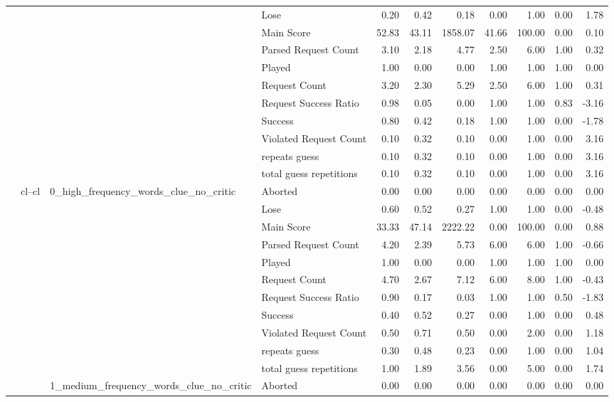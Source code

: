 \begin{tabular}{llllrrrrrrr}
 &  &  & Lose & 0.20 & 0.42 & 0.18 & 0.00 & 1.00 & 0.00 & 1.78 \\
 &  &  & Main Score & 52.83 & 43.11 & 1858.07 & 41.66 & 100.00 & 0.00 & 0.10 \\
 &  &  & Parsed Request Count & 3.10 & 2.18 & 4.77 & 2.50 & 6.00 & 1.00 & 0.32 \\
 &  &  & Played & 1.00 & 0.00 & 0.00 & 1.00 & 1.00 & 1.00 & 0.00 \\
 &  &  & Request Count & 3.20 & 2.30 & 5.29 & 2.50 & 6.00 & 1.00 & 0.31 \\
 &  &  & Request Success Ratio & 0.98 & 0.05 & 0.00 & 1.00 & 1.00 & 0.83 & -3.16 \\
 &  &  & Success & 0.80 & 0.42 & 0.18 & 1.00 & 1.00 & 0.00 & -1.78 \\
 &  &  & Violated Request Count & 0.10 & 0.32 & 0.10 & 0.00 & 1.00 & 0.00 & 3.16 \\
 &  &  & repeats guess & 0.10 & 0.32 & 0.10 & 0.00 & 1.00 & 0.00 & 3.16 \\
 &  &  & total guess repetitions & 0.10 & 0.32 & 0.10 & 0.00 & 1.00 & 0.00 & 3.16 \\
\cline{2-11} \cline{3-11}
 & \multirow[t]{33}{*}{cl--cl} & \multirow[t]{11}{*}{0_high_frequency_words_clue_no_critic} & Aborted & 0.00 & 0.00 & 0.00 & 0.00 & 0.00 & 0.00 & 0.00 \\
 &  &  & Lose & 0.60 & 0.52 & 0.27 & 1.00 & 1.00 & 0.00 & -0.48 \\
 &  &  & Main Score & 33.33 & 47.14 & 2222.22 & 0.00 & 100.00 & 0.00 & 0.88 \\
 &  &  & Parsed Request Count & 4.20 & 2.39 & 5.73 & 6.00 & 6.00 & 1.00 & -0.66 \\
 &  &  & Played & 1.00 & 0.00 & 0.00 & 1.00 & 1.00 & 1.00 & 0.00 \\
 &  &  & Request Count & 4.70 & 2.67 & 7.12 & 6.00 & 8.00 & 1.00 & -0.43 \\
 &  &  & Request Success Ratio & 0.90 & 0.17 & 0.03 & 1.00 & 1.00 & 0.50 & -1.83 \\
 &  &  & Success & 0.40 & 0.52 & 0.27 & 0.00 & 1.00 & 0.00 & 0.48 \\
 &  &  & Violated Request Count & 0.50 & 0.71 & 0.50 & 0.00 & 2.00 & 0.00 & 1.18 \\
 &  &  & repeats guess & 0.30 & 0.48 & 0.23 & 0.00 & 1.00 & 0.00 & 1.04 \\
 &  &  & total guess repetitions & 1.00 & 1.89 & 3.56 & 0.00 & 5.00 & 0.00 & 1.74 \\
\cline{3-11}
 &  & \multirow[t]{11}{*}{1_medium_frequency_words_clue_no_critic} & Aborted & 0.00 & 0.00 & 0.00 & 0.00 & 0.00 & 0.00 & 0.00 \\

\end{tabular}
